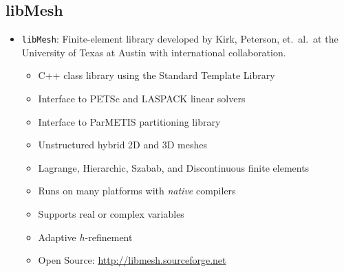 \documentclass[compress,12pt]{beamer}
\begin{document}
\subsection{libMesh}
\begin{frame}%
  \begin{itemize} %
    \item \texttt{libMesh}: Finite-element library developed by Kirk, Peterson, et.~al.\
       at the University of Texas at Austin with international collaboration.
      \begin{itemize}
        \item C++ class library using the Standard Template Library
        \item Interface to PETSc and LASPACK linear solvers
        \item Interface to ParMETIS partitioning library
        \item Unstructured hybrid 2D and 3D meshes
        \item Lagrange, Hierarchic, Szabab, and Discontinuous finite elements
        \item Runs on many platforms with \emph{native} compilers
	\item Supports real or complex variables
        \item Adaptive $h$-refinement
	\item Open Source: \url{http://libmesh.sourceforge.net}
      \end{itemize}
  \end{itemize}
\end{frame}


\end{document}

